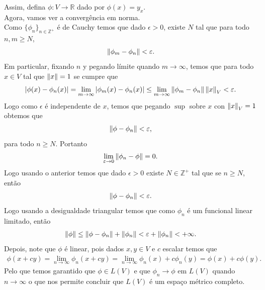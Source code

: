 \begin{homeworkProblem}[4]
\begin{solution}
\begin{enumerate}
      Assim, defina $\phi:V\to\mathbb{R}$ dado por $\phi(x)=y_x$.\\
      Agora, vamos ver a convergência em norma.\\
      Como $\{\phi_n\}_{n\in\mathbb{Z}^{+}}$ é de Cauchy temos que dado $\epsilon>0$, existe $N$ tal que para todo $n,m\geq N$,
      \begin{align*}
        \left\|\phi_m - \phi_n\right\| < \varepsilon.
      \end{align*}
      Em particular, fixando $n$ y pegando límite quando $m\to \infty$, temos que para todo $x\in V$ tal que $\left\|x\right\|=1$ se cumpre que
      \begin{align*}
        \left| \phi(x)-\phi_n(x) \right|=\lim_{m \to \infty}\left| \phi_m(x)-\phi_n(x) \right|\leq \lim_{m \to \infty}\left\|\phi_m-\phi_n\right\|\left\|x\right\|_{V}< \varepsilon.
      \end{align*}
      Logo como $\epsilon$ é independente de $x$, temos que pegando $\sup$ sobre $x$ con $\left\|x\right\|_V = 1$ obtemos que
      \begin{align*}
        \left\|\phi-\phi_n\right\|<\varepsilon,
      \end{align*}
      para todo $n\geq N$. Portanto
      \begin{align*}
        \lim_{\varepsilon \to 0}\left\|\phi_n-\phi\right\|=0.
      \end{align*}
      Logo usando o anterior temos que dado $\epsilon>0$ existe $N\in\mathbb{Z}^{+}$ tal que se $n\geq N$, então
      \begin{align*}
        \left\|\phi-\phi_n\right\|<\varepsilon.
      \end{align*}
      Logo usando a desigualdade triangular temos que como $\phi_n$ é um funcional linear limitado, então 
      \begin{align*}
        \left\|\phi\right\|\leq \left\|\phi-\phi_n\right\|+\left\|\phi_n\right\|<\varepsilon+\left\|\phi_n\right\|<+\infty.
      \end{align*}
      Depois, note que $\phi$ é linear, pois dados $x,y\in V$ e $c$ escalar temos que
      \begin{align*}
        \phi(x+cy)=\lim_{n \to \infty}\phi_n(x+cy)=\lim_{n \to \infty}\phi_n(x)+c\phi_n(y)=\phi(x)+c\phi(y).
      \end{align*}
      Pelo que temos garantido que $\phi\in L(V)$ e que $\phi_n\to\phi$ em $L(V)$ quando $n\to\infty$ o que nos permite concluir que $L(V)$ é um espaço métrico completo. 
  \end{enumerate} 
  \end{solution}
\end{homeworkProblem}
